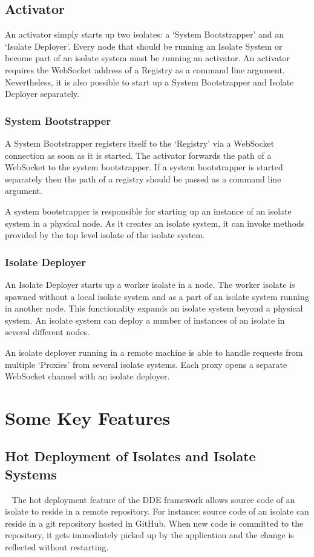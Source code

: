\subsection{Activator}
  An activator simply starts up two isolates: a ‘System Bootstrapper’ and an ‘Isolate Deployer’. Every node that should be running an Isolate System or become part of an isolate system must be running an activator. An activator requires the WebSocket address of a Registry as a command line argument. Nevertheless, it is also possible to start up a System Bootstrapper and Isolate Deployer separately.

  \subsubsection{System Bootstrapper}
  \label{subsubsec:bootstrapper}
  A System Bootstrapper registers itself to the ‘Registry’ via a WebSocket connection as soon as it is started. The activator forwards the path of a WebSocket to the system bootstrapper. If a system bootstrapper is started separately then the path of a registry should be passed as a command line argument.

  A system bootstrapper is responsible for starting up an instance of an isolate system in a physical node. As it creates an isolate system, it can invoke methods provided by the top level isolate of the isolate system.

  \subsubsection{Isolate Deployer}
  \label{subsubsec:isolateDeployer}
An Isolate Deployer starts up a worker isolate in a node. The worker isolate is spawned without a local isolate system and as a part of an isolate system running in another node. This functionality expands an isolate system beyond a physical system. An isolate system can deploy a number of instances of an isolate in several different nodes.

  An isolate deployer running in a remote machine is able to handle requests from multiple ‘Proxies’ from several isolate systems. Each proxy opens a separate WebSocket channel with an isolate deployer.

\section{Some Key Features}
\subsection{Hot Deployment of Isolates and Isolate Systems}
~\label{subsec:hotDeployment}
The hot deployment feature of the DDE framework allows source code of an isolate to reside in a remote repository. For instance: source code of an isolate can reside in a git repository hosted in GitHub. When new code is committed to the repository, it gets immediately picked up by the application and the change is reflected without restarting.

